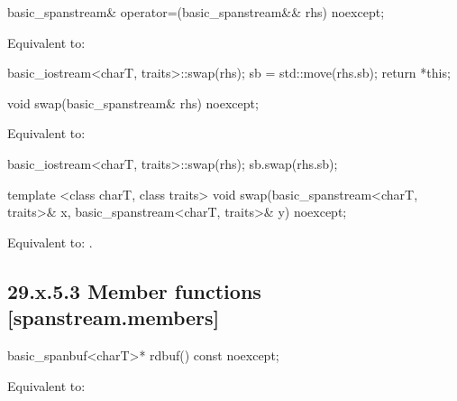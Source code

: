 \documentclass[ebook,11pt,article]{memoir}
\begin{document}
\begin{itemdecl}
basic_spanstream& operator=(basic_spanstream&& rhs) noexcept;
\end{itemdecl}

\begin{itemdescr}
\pnum
\effects Equivalent to:
\begin{codeblock}
    basic_iostream<charT, traits>::swap(rhs);
    sb = std::move(rhs.sb);
    return *this;
\end{codeblock}
\end{itemdescr}

\begin{itemdecl}
void swap(basic_spanstream& rhs) noexcept;
\end{itemdecl}

\begin{itemdescr}
\pnum
\effects Equivalent to:
\begin{codeblock}
    basic_iostream<charT, traits>::swap(rhs);
    sb.swap(rhs.sb);
\end{codeblock}
\end{itemdescr}


\begin{itemdecl}
template <class charT, class traits>
  void swap(basic_spanstream<charT, traits>& x,
            basic_spanstream<charT, traits>& y) noexcept;
\end{itemdecl}

\begin{itemdescr}
\pnum
\effects Equivalent to: .
\end{itemdescr}

\subsection{29.x.5.3 Member functions [spanstream.members]}
\label{spanstream.members}

\begin{itemdecl}
basic_spanbuf<charT>* rdbuf() const noexcept;
\end{itemdecl}

\begin{itemdescr}
\pnum
\effects Equivalent to: \\
\end{itemdescr}
\end{document}
